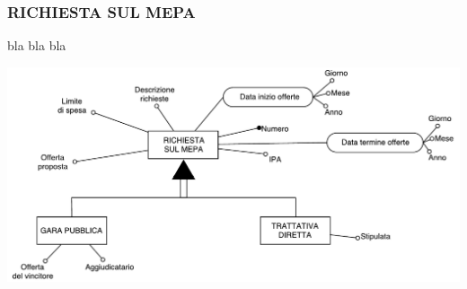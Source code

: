 \subsubsection{RICHIESTA SUL MEPA}
bla bla bla

\includegraphics[width=0.7\linewidth]{./immagini/richiesta_sul_mepa.pdf}



%
%
%
%
%
%
%
